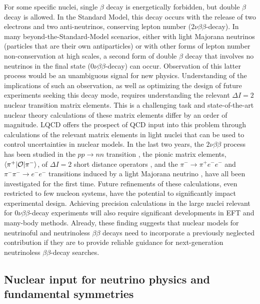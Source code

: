 For some specific nuclei, single $\beta$ decay is energetically forbidden, but double $\beta$ decay is allowed. In the Standard Model, this decay occurs with the release of two electrons and two anti-neutrinos, conserving lepton number  ($2\nu\beta\beta$-decay). In many beyond-the-Standard-Model scenarios, either with light Majorana neutrinos (particles that are their own antiparticles) or with other forms of lepton number non-conservation at high scales,  a second form of  double $\beta$ decay that involves no neutrinos in the final state ($0\nu\beta\beta$-decay) can occur. Observation of this latter process would be an unambiguous signal for new physics. Understanding of the implications of such an observation, as well as optimizing the design of future experiments seeking this decay mode, requires understanding the relevant $\Delta I=2$ nuclear transition matrix elements. This is a challenging task and state-of-the-art nuclear theory calculations of these matrix elements differ by an order of magnitude. LQCD offers the prospect of QCD input into  this problem through calculations of the relevant matrix elements in light nuclei that can be used to control uncertainties in nuclear models. In the last two years, the $2\nu\beta\beta$ process has been studied in the $pp\to nn$ transition \cite{Tiburzi:2017iux,Shanahan:2017bgi}, the pionic matrix elements, $\langle \pi^+ | {\cal O} | \pi^- \rangle$, of $\Delta I =2$ short distance operators \cite{Nicholson:2018mwc}, and the $\pi^-\to \pi^+ e^- e^-$ and $\pi^-\pi^-\to e^-e^-$ transitions induced  by a light Majorana neutrino \cite{Feng:2018pdq,Detmold:2018zan}, have all been investigated for the first time. Future refinements of these calculations, even restricted to few nucleon systems, have the potential to significantly impact experimental design. Achieving precision calculations in the large nuclei relevant for $0\nu\beta\beta$-decay experiments will also require significant developments in EFT and many-body methods. Already, these finding suggests that nuclear models for neutrinoful and neutrinoless $\beta\beta$ decays need to incorporate a previously neglected contribution if they are to provide reliable guidance for next-generation neutrinoless $\beta\beta$-decay searches. 





\subsection{Nuclear input for neutrino physics and fundamental symmetries}


